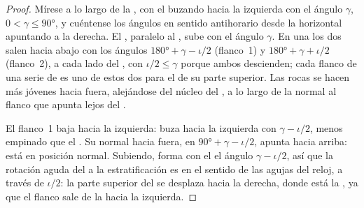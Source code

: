 \begin{proof}
Mírese a lo largo de la , con el  buzando hacia la izquierda con el ángulo
$\gamma$, $0 < \gamma \le \ang{90}$, y cuéntense los ángulos en sentido antihorario desde la horizontal apuntando a la derecha.
El , paralelo al , sube con el ángulo $\gamma$. En una   los dos  salen hacia abajo con
los ángulos $\ang{180} + \gamma - \iota/2$ (flanco~1) y $\ang{180} + \gamma + \iota/2$ (flanco~2), a cada lado del ,
con $\iota/2 \le \gamma$ porque ambos descienden; cada flanco de una serie de  es uno de estos dos para el 
de su parte superior. Las rocas se hacen más jóvenes hacia fuera, alejándose del núcleo del , a lo largo de la normal
al flanco que apunta lejos del .

El flanco~1 baja hacia la izquierda: buza hacia la izquierda con $\gamma - \iota/2$, menos empinado que el . Su normal
hacia fuera, en $\ang{90} + \gamma -
\iota/2$, apunta hacia arriba: está en posición normal. Subiendo, forma con el  el
ángulo $\gamma - \iota/2$, así que la rotación aguda del  a la estratificación es en el sentido de las agujas del reloj,
a través de $\iota/2$: la parte superior del  se desplaza hacia la derecha, donde está la , ya que el flanco sale
de la  hacia la izquierda.


\end{proof}
